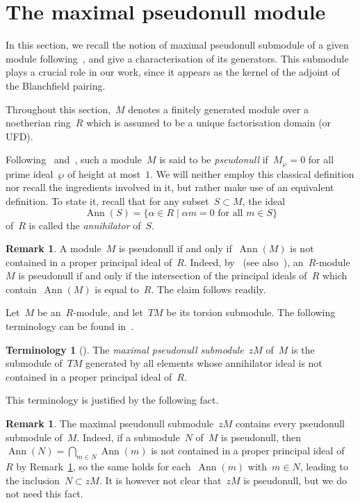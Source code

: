 \documentclass[10.9pt,a4paper]{amsart}
\theoremstyle{definition}
\newtheorem{terminology}[theorem]{Terminology}
\newtheorem{remark}[theorem]{Remark}
\theoremstyle{remark}
\newcommand{\Ann}{\operatorname{Ann}}
\begin{document}
\section{The maximal pseudonull module}
\label{sub:PseudoNull}

In this section, we recall the notion of maximal pseudonull submodule of a given module following~\cite{hillman2012}, and give a characterisation of its generators.
This submodule plays a crucial role in our work, since it appears as the kernel of the adjoint of the Blanchfield pairing.

\medskip

Throughout this section,~$M$ denotes a finitely generated module over a noetherian ring~$R$ which is assumed to be a unique factorisation domain (or UFD).

Following~\cite[$\S$4.4]{Bourbaki} and~\cite[p.32]{HillmanAlexanderIdeals}, such a module~$M$ is said to be {\em pseudonull\/} if~$M_{\wp}=0$ for all prime ideal~$\wp$ of height at most~$1$.
We will neither employ this classical definition nor recall the ingredients involved in it, but rather make use of an equivalent definition. To state it, recall that for any subset~$S\subset M$, the ideal
\[
\Ann(S)=\{\alpha\in R\mid \alpha m=0\text{ for all~$m\in S$}\}
\]
of~$R$ is called the \emph{annihilator} of~$S$.

\begin{remark}
\label{rem:pseudonull}
A module~$M$ is pseudonull if and only if~$\Ann(M)$ is not contained in a proper principal ideal of~$R$.
Indeed, by~\cite[p.33]{HillmanAlexanderIdeals} (see also~\cite[Proposition~9]{Bourbaki}), an~$R$-module~$M$
is pseudonull if and only if the intersection of the principal ideals of~$R$ which contain~$\Ann(M)$ is equal to~$R$.
The claim follows readily.
\end{remark}

Let~$M$ be an~$R$-module, and let~$TM$ be its torsion submodule.
The following terminology can be found in~\cite[Section~2.5]{hillman2012}.

\begin{terminology}[\cite{hillman2012}]
\label{def:MaximalPseudonull}
The \emph{maximal pseudonull submodule}~$zM$ of~$M$ is the submodule of~$TM$ generated by all elements whose annihilator ideal is not contained in a proper principal ideal of~$R$.
\end{terminology}

This terminology is justified by the following fact.

\begin{remark}
\label{rem:N-in-zM}
The maximal pseudonull submodule~$zM$ contains every pseudonull submodule of~$M$.
Indeed, if a submodule~$N$ of~$M$ is pseudonull, then~$\Ann(N)=\bigcap_{m\in N}\Ann(m)$ is not 
contained in a proper principal ideal of~$R$ by Remark~\ref{rem:pseudonull}, so the same holds for
each~$\Ann(m)$ with~$m\in N$, leading to the inclusion~$N\subset zM$. 
It is however not clear that~$zM$ is pseudonull, but we do not need this fact.
\end{remark}
\end{document}
